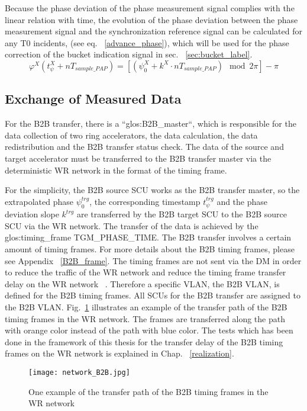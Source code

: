 Because the phase deviation of the phase measurement signal complies with the linear relation with time, the evolution of the phase deviation between the phase measurement signal and the synchronization reference signal can be calculated for any T0 incidents, (see eq. ~\ref{advance_phase}), which will be used for the phase correction of the bucket indication signal in sec. ~\ref{sec:bucket_label}.
\begin{equation}
\label{advance_phase}
\varphi^\mathit{X}(t_\mathit{\psi}^\mathit{X}+nT_\mathit{sample\_PAP})=[(\psi^\mathit{X}_0+k^\mathit{X}\cdot nT_\mathit{sample\_PAP}) \mod 2\pi] - \pi
\end{equation}

\subsection{Exchange of Measured Data}

For the B2B transfer, there is a ``\gls{glos:B2B_master}``, which is responsible for the data collection of two ring accelerators, the data calculation, the data redistribution and the B2B transfer status check. The data of the source and target accelerator must be transferred to the B2B transfer master via the deterministic WR network in the format of the timing frame.
 
For the simplicity, the B2B source SCU works as the B2B transfer master, so the extrapolated phase $\psi^\mathit{trg}_0$, the corresponding timestamp $t_\psi^\mathit{trg}$ and the phase deviation slope $k^\mathit{trg}$ are transferred by the B2B target SCU to the B2B source SCU via the WR network. The transfer of the data is achieved by the \gls{glos:timing_frame} TGM\_PHASE\_TIME. The B2B transfer involves a certain amount of timing frames. For more details about the B2B timing frames, please see Appendix ~\ref{B2B_frame}. The timing frames are not sent via the DM in order to reduce the traffic of the WR network and reduce the timing frame transfer delay on the WR network ~\cite{bai_f-tc-c-05_2016}. Therefore a specific VLAN, the B2B \gls{VLAN}, is defined for the B2B timing frames. All SCUs for the B2B transfer are assigned to the B2B VLAN. Fig.~\ref{network_B2B} illustrates an example of the transfer path of the B2B timing frames in the WR network. The frames are transferred along the path with orange color instead of the path with blue color. The tests which has been done in the framework of this thesis for the transfer delay of the B2B timing frames on the WR network is explained in Chap. ~\ref{realization}.
 \begin{figure}[!htb]
   \centering   
   \texttt{[image: network\_B2B.jpg]}
   \caption{One example of the transfer path of the B2B timing frames in the WR network}
   \label{network_B2B}
\end{figure}

